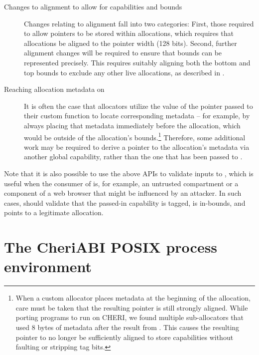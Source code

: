 \documentclass[12pt,twoside,openright,usletter]{article}
\newcommand{\ccode}[1]{{\small\ttfamily{#1}}}
\newcommand{\cfunc}[1]{{\ccode{#1()}}}
\newcommand{\note}[2]{{\color{blue}[ Note: #1 - #2]}}
\renewcommand{\note}[2]{\relax\ifhmode\unskip\fi}
\newcommand{\arnote}[1]{\note{#1}{Alex R.}}
\begin{document}
\begin{description}
\item[Changes to alignment to allow for capabilities and bounds]
  Changes relating to alignment fall into two categories:
  First, those required to allow pointers to be stored within allocations,
  which requires that allocations be aligned to the pointer width (128 bits).
  Second, further alignment changes will be required to ensure that bounds can
  be represented precisely.
  This requires suitably aligning both the bottom and top bounds to exclude
  any other live allocations, as described in
  .\arnote{May want to switch order of sections?}

\item[Reaching allocation metadata on \cfunc{free}]
  It is often the case that allocators utilize the value of the pointer passed
  to their custom \cfunc{free} function to locate corresponding metadata --
  for example, by always placing that metadata immediately before the
  allocation, which would be outside of the allocation's bounds.\footnote{%
  When a custom allocator places metadata at the beginning of the allocation,
  care must be taken that the resulting pointer is still strongly aligned.
  While porting programs to run on CHERI, we found multiple sub-allocators
  that used 8 bytes of metadata after the result from \cfunc{malloc}.
  This causes the resulting pointer to no longer be sufficiently aligned to
  store capabilities without faulting or stripping tag bits.
  \note{Does CHERI ISAv7 still fault in any of these scenarios?}{nwf}
  }
  Therefore, some additional work may be required to derive a pointer to the
  allocation's metadata via another global capability, rather than the one
  that has been passed to \cfunc{free}.
\end{description}

Note that it is also possible to use the above APIs to validate inputs to
\cfunc{free}, which is useful when the consumer of \cfunc{free} is, for example,
an untrusted compartment or a component of a web browser that might be
influenced by an attacker. In such cases, \cfunc{free} should validate that the
passed-in capability is tagged, is in-bounds, and points to a legitimate
allocation.

\section{The CheriABI POSIX process environment}
\label{sec:cheriabi}
\end{document}
